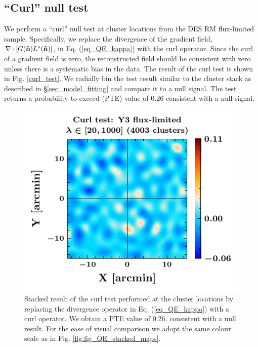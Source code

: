 \subsection{``Curl'' null test}\label{sec_null_tests}

We perform a ``curl'' null test \citep{hu07} at \howmanyclustersinfullsample{} cluster locations from the DES RM \whichyear{} flux-limited sample.
Specifically, we replace the divergence of the gradient field, $\nabla \cdot [G(\bm{\hat{\mbox{n}}}) L^{*}(\bm{\hat{\mbox{n}}})]$, in Eq. (\ref{eq_QE_kappa}) with the curl operator. 
Since the curl of a gradient field is zero, the reconstructed field should be consistent with zero unless there is a systematic bias in the data. 
The result of the curl test is shown in Fig. \ref{curl_test}. 
We radially bin the test result similar to the cluster stack as described in \S\ref{sec_model_fitting} and compare it to a null signal.
The test returns a probability to exceed (PTE) value of 0.26 consistent with a null signal.

\begin{figure}[ht]
\includegraphics[width=\linewidth]{figs/kappa_model_MF_y3_v6_4_22_full_curl_test_JODY.pdf}
\caption{Stacked result of the curl test performed at the cluster locations by replacing the divergence operator in Eq. (\ref{eq_QE_kappa}) with a curl operator. %
We obtain a PTE value of 0.26, consistent with a null result.
For the ease of visual comparison we adopt the same colour scale as in Fig. \ref{fig:fig_QE_stacked_maps}.
}
\end{figure}
\label{curl_test}
